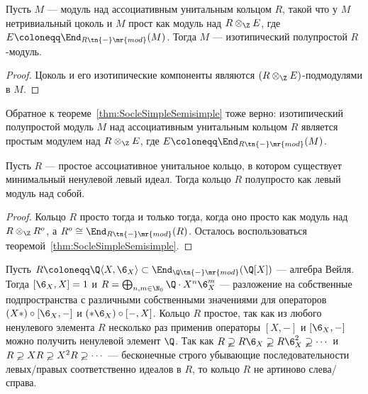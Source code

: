 \documentclass[
	extrafontsizes,
	11pt,
	hyphens,
]{memoir}
\begin{document}
\begin{theorem}\label{thm:SocleSimpleSemisimple}
Пусть \(M\) --- модуль над ассоциативным унитальным кольцом \(R\), такой что у \(M\) нетривиальный цоколь и \(M\) прост как модуль над \(R \otimes_{\Z} E\), где \(E \coloneqq \End_{R\tn{-}\mr{mod}}(M)\).
Тогда \(M\) --- изотипический полупростой \(R\)-мо\-дуль.
\end{theorem}

\begin{proof}
Цоколь и его изотипические компоненты являются \((R \otimes_{\Z} E)\)-под\-мо\-ду\-ля\-ми в \(M\).
\end{proof}

\begin{remark}
Обратное к теореме~\ref{thm:SocleSimpleSemisimple} тоже верно:
изотипический полупростой модуль \(M\) над ассоциативным унитальным кольцом \(R\) является простым модулем над \(R \otimes_{\Z} E\), где \(E \coloneqq \End_{R\tn{-}\mr{mod}}(M)\).
\end{remark}

\begin{corollary}\label{cor:SimpleRingSemisimple}
Пусть \(R\) --- простое ассоциативное унитальное кольцо, в котором существует минимальный ненулевой левый идеал. Тогда кольцо \(R\) полупросто как левый модуль над собой.
\end{corollary}

\begin{proof}
Кольцо \(R\) просто тогда и только тогда, когда оно просто как модуль над \(R \otimes_{\Z} R^o\), а \(R^o \cong \End_{R\tn{-}\mr{mod}}(R)\).
Осталось воспользоваться теоремой~\ref{thm:SocleSimpleSemisimple}.
\end{proof}

\begin{example}
\label{exa:WeylAlgebraSimple}
Пусть \(R \coloneqq \Q\langle X, \6_X \rangle \subset \End_{\Q\tn{-}\mr{mod}}(\Q[X])\) --- алгебра Вейля.
Тогда \([\6_X, X] = 1\) и \(R = \bigoplus_{n, m \in \N_0} \Q \cdot X^n \6_X^m\)
--- разложение на собственные подпространства с различными собственными значениями для операторов \((X*) \circ [\6_X, -]\) и \((*\6_X) \circ [-, X]\).
Кольцо \(R\) простое, так как из любого ненулевого элемента \(R\) несколько раз применив операторы \([X, -]\) и \([\6_X, -]\) можно получить ненулевой элемент \(\Q\).
Так как \(R \varsupsetneq R \6_X \varsupsetneq R \6_X^2 \varsupsetneq \cdots{}\) и \(R \varsupsetneq X R \varsupsetneq X^2 R \varsupsetneq \cdots{}\) --- бесконечные строго убывающие последовательности левых/правых соответственно идеалов в \(R\), то кольцо \(R\) не артиново слева/справа.
\end{example}
\end{document}
